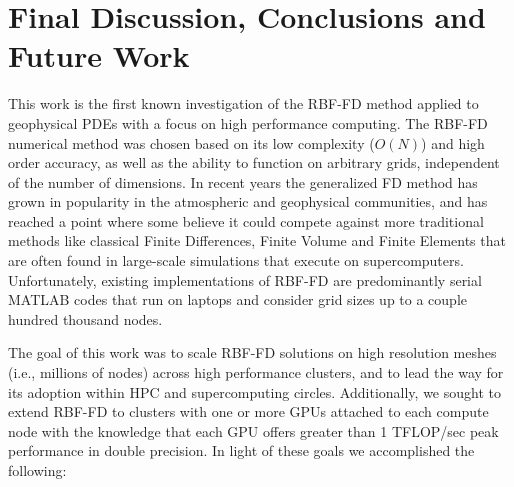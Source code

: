 \chapter{Final Discussion, Conclusions and Future Work}
\label{chap:conclusions}

This work is the first known investigation of the RBF-FD method applied to geophysical PDEs with a focus on high performance computing. The RBF-FD numerical method was chosen based on its low complexity ($O(N)$) and high order accuracy, as well as the ability to function on arbitrary grids, independent of the number of dimensions. In recent years the generalized FD method has grown in popularity in the atmospheric and geophysical communities, and has reached a point where some believe it could compete against more traditional methods like classical Finite Differences, Finite Volume and Finite Elements that are often found in large-scale simulations that execute on supercomputers. Unfortunately, existing implementations of RBF-FD are predominantly serial MATLAB codes that run on laptops and consider grid sizes up to a couple hundred thousand nodes.


The goal of this work was to scale RBF-FD solutions on high resolution meshes (i.e., millions of nodes) across high performance clusters, and to lead the way for its adoption within HPC and supercomputing circles. Additionally, we sought to extend RBF-FD to clusters with one or more GPUs attached to each compute node with the knowledge that each GPU offers greater than 1 TFLOP/sec peak performance in double precision. In light of these goals we accomplished the following: 

